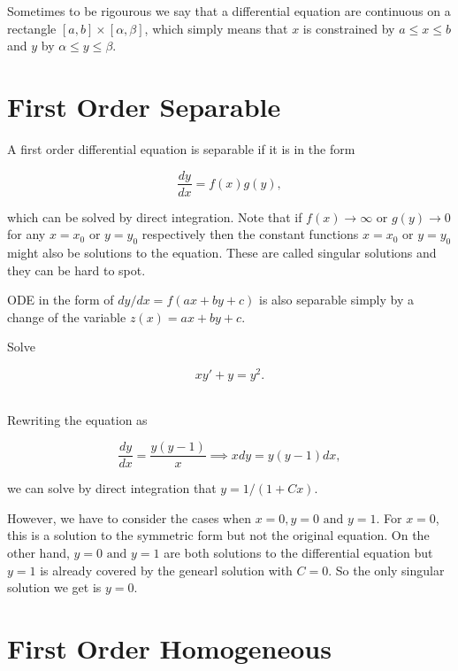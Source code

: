 \documentclass[english,a4paper,12pt]{report}
\begin{document}

Sometimes to be rigourous we say that a differential equation are continuous on a rectangle \([a,b] \times [\alpha ,\beta ]\), which simply means that \(x\) is constrained by \(a \le x \le b\) and \(y\) by \(\alpha \le y \le \beta \).   

\section{First Order Separable}

A first order differential equation is separable if it is in the form

\begin{equation}
    \frac{dy}{dx} = f(x)g(y),
\end{equation}

which can be solved by direct integration. Note that if \(f(x) \to \infty \text { or } g(y) \rightarrow 0\) for any \(x=x_0 \text { or } y=y_0 \) respectively then the constant functions \(x=x_0 \text { or } y = y_0 \) might also be solutions to the equation. These are called singular solutions and they can be hard to spot.

ODE in the form of \(dy /dx = f(ax+by+c)\) is also separable simply by a change of the variable \(z(x) = ax + by + c\).

{Solve 

\begin{equation}
    xy'+y=y^2.
\end{equation}~
}
{Rewriting the equation as 

\begin{equation}
    \frac{dy}{dx} = \frac{y(y-1)}{x} \implies xdy = y(y-1)dx,
\end{equation}

we can solve by direct integration that \(y = 1 / (1+Cx)  \). 

However, we have to consider the cases when \(x = 0, y = 0 \text { and } y = 1\). For \(x = 0\), this is a solution to the symmetric form but not the original equation. On the other hand, \(y=0\text { and } y=1\) are both solutions to the differential equation but \(y = 1\) is already covered by the genearl solution with \(C = 0\). So the only singular solution we get is \(y = 0\).    
} 


\section{First Order Homogeneous} \label{homo} 
\end{document}
